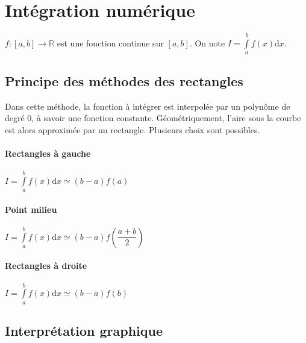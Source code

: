 

\section{Intégration numérique}


\begin{hypo}  $f:[a,b]\rightarrow \mathbb{R}$ est une fonction continue sur $[a,b]$. On note $I = \int\limits_a^{b} f(x) \mathrm{d}x $.
\end{hypo}

\subsection{Principe des méthodes des rectangles}
\begin{defi}
Dans cette méthode, la fonction à intégrer est interpolée par un polynôme de degré 0, à savoir une fonction constante. Géométriquement, l'aire sous la courbe est alors approximée par un rectangle. Plusieurs choix sont possibles.

\paragraph*{Rectangles à gauche}
$I = \int\limits_a^{b} f(x) \mathrm{d}x \simeq \left(b-a\right) f(a) $

\paragraph*{Point milieu}
$I = \int\limits_a^{b} f(x) \mathrm{d}x \simeq \left(b-a\right) f\left(\dfrac{a+b}{2}\right) $

\paragraph*{Rectangles à droite}
$I = \int\limits_a^{b} f(x) \mathrm{d}x \simeq \left(b-a\right) f(b) $

\end{defi}

\subsection{Interprétation graphique}

